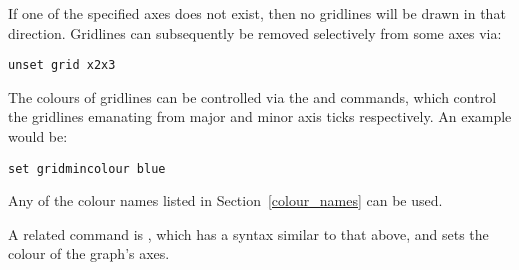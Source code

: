 If one of the specified axes does not exist, then no gridlines will be drawn in
that direction.  Gridlines can subsequently be removed selectively from some
axes via:

\begin{verbatim}
unset grid x2x3
\end{verbatim}

The colours of gridlines can be
controlled via the  and  commands, which control the gridlines emanating from major and
minor axis ticks respectively. An example would be:

\begin{verbatim}
set gridmincolour blue
\end{verbatim}

\noindent Any of the colour names listed in Section~\ref{colour_names} can be
used.

A related command is , which has a syntax similar to that above, and sets the colour of
the graph's axes.\label{set_colours}

